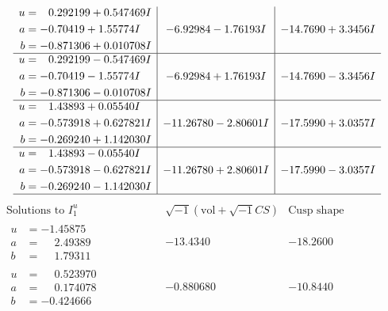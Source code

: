 \documentclass[1p]{elsarticle_modified}
\theoremstyle{definition}
\newcommand{\I}{\sqrt{-1}}
\begin{document}
$$\begin{array}{c|c|c}
\begin{aligned}
u &= \phantom{-}0.292199 + 0.547469 I \\
a &= -0.70419 + 1.55774 I \\
b &= -0.871306 + 0.010708 I\end{aligned}
 & -6.92984 - 1.76193 I & -14.7690 + 3.3456 I \\ \hline\begin{aligned}
u &= \phantom{-}0.292199 - 0.547469 I \\
a &= -0.70419 - 1.55774 I \\
b &= -0.871306 - 0.010708 I\end{aligned}
 & -6.92984 + 1.76193 I & -14.7690 - 3.3456 I \\ \hline\begin{aligned}
u &= \phantom{-}1.43893 + 0.05540 I \\
a &= -0.573918 + 0.627821 I \\
b &= -0.269240 + 1.142030 I\end{aligned}
 & -11.26780 - 2.80601 I & -17.5990 + 3.0357 I \\ \hline\begin{aligned}
u &= \phantom{-}1.43893 - 0.05540 I \\
a &= -0.573918 - 0.627821 I \\
b &= -0.269240 - 1.142030 I\end{aligned}
 & -11.26780 + 2.80601 I & -17.5990 - 3.0357 I\\
 \hline 
 \end{array}$$\newpage$$\begin{array}{c|c|c}  
\text{Solutions to }I^u_{1}& \I (\text{vol} + \sqrt{-1}CS) & \text{Cusp shape}\\
 \hline 
\begin{aligned}
u &= -1.45875\phantom{ +0.000000I} \\
a &= \phantom{-}2.49389\phantom{ +0.000000I} \\
b &= \phantom{-}1.79311\phantom{ +0.000000I}\end{aligned}
 & -13.4340\phantom{ +0.000000I} & -18.2600\phantom{ +0.000000I} \\ \hline\begin{aligned}
u &= \phantom{-}0.523970\phantom{ +0.000000I} \\
a &= \phantom{-}0.174078\phantom{ +0.000000I} \\
b &= -0.424666\phantom{ +0.000000I}\end{aligned}
 & -0.880680\phantom{ +0.000000I} & -10.8440\phantom{ +0.000000I} \\ \hline\begin{aligned}

\end{aligned}
\end{array}$$
\end{document}
